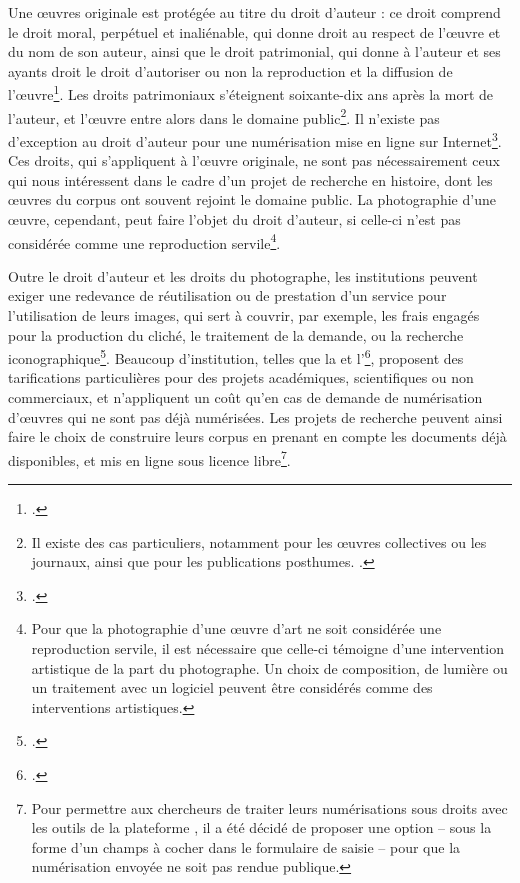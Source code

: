 	Une œuvres originale est protégée au titre du droit d'auteur : ce droit comprend le droit moral, perpétuel et inaliénable, qui donne droit au respect de l'œuvre et du nom de son auteur, ainsi que le droit patrimonial, qui donne à l'auteur et ses ayants droit le droit d'autoriser ou non la reproduction et la diffusion de l'œuvre\footcite{sepetjanRespecterDroitPropriete2017}. Les droits patrimoniaux s'éteignent soixante-dix ans après la mort de l'auteur, et l'œuvre entre alors dans le domaine public\footnote{Il existe des cas particuliers, notamment pour les œuvres collectives ou les journaux, ainsi que pour les publications posthumes. \cite{GuidePratiquePour}.}. Il n'existe pas d'exception au droit d'auteur pour une numérisation mise en ligne sur Internet\footcite{sepetjanRespecterDroitPropriete2017}. Ces droits, qui s'appliquent à l'œuvre originale, ne sont pas nécessairement ceux qui nous intéressent dans le cadre d'un projet de recherche en histoire, dont les œuvres du corpus ont souvent rejoint le domaine public. La photographie d'une œuvre, cependant, peut faire l'objet du droit d'auteur, si celle-ci n'est pas considérée comme une reproduction servile\footnote{Pour que la photographie d'une œuvre d'art ne soit considérée une reproduction servile, il est nécessaire que celle-ci témoigne d'une intervention artistique de la part du photographe. Un choix de composition, de lumière ou un traitement avec un logiciel peuvent être considérés comme des interventions artistiques.}.
	
	Outre le droit d'auteur et les droits du photographe, les institutions peuvent exiger une redevance de réutilisation ou de prestation d'un service pour l'utilisation de leurs images, qui sert à couvrir, par exemple, les frais engagés pour la production du cliché, le traitement de la demande, ou la recherche iconographique\footcite{GuidePratiquePour}. Beaucoup d'institution, telles que la \bnf et l'\inha\footcite{denoyelleProposCoutImages2021}, proposent des tarifications particulières pour des projets académiques, scientifiques ou non commerciaux, et n'appliquent un coût qu'en cas de demande de numérisation d'œuvres qui ne sont pas déjà numérisées. Les projets de recherche peuvent ainsi faire le choix de construire leurs corpus en prenant en compte les documents déjà disponibles, et mis en ligne sous licence libre\footnote{Pour permettre aux chercheurs de traiter leurs numérisations sous droits avec les outils de la plateforme \eida, il a été décidé de proposer une option -- sous la forme d'un champs à cocher dans le formulaire de saisie -- pour que la numérisation envoyée ne soit pas rendue publique.}.

